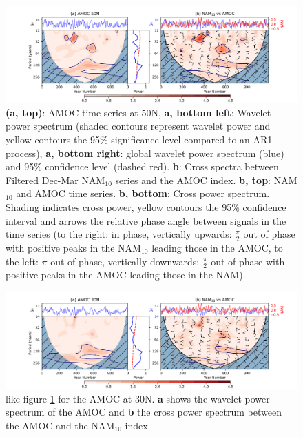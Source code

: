\begin{center}
\begin{figure}[h!]
\noindent\includegraphics[width = \linewidth]{Figures/Figures-surface/AMOC_NAM_filtered_subplot.png}
\caption[Wavelet power spectrum of the AMOC at 50N and cross spectrum with the NAM$_{10}$ index]{\textbf{(a, top)}: AMOC time series at 50N, \textbf{a, bottom left}: Wavelet power spectrum (shaded contours represent wavelet power and yellow contours the 95\% significance level compared to an AR1 process), \textbf{a, bottom right}: global wavelet power spectrum (blue) and 95\% confidence level (dashed red). \textbf{b}: Cross spectra between Filtered Dec-Mar NAM$_{10}$ series and the AMOC index. \textbf{b, top}: NAM$_{10}$ and AMOC time series. \textbf{b, bottom}: Cross power spectrum. Shading indicates cross power, yellow contours the 95\% confidence interval and arrows the relative phase angle between signals in the time series (to the right: in phase, vertically upwards: $\frac{\pi}{2}$ out of phase with positive peaks in the NAM$_{10}$ leading those in the AMOC, to the left: $\pi$ out of phase, vertically downwards: $\frac{\pi}{2}$ out of phase with positive peaks in the AMOC leading those in the NAM).}
\label{NAM_AMOC_Cross}
\end{figure}
\end{center}

\begin{center}
\begin{figure}[h!]
\noindent\includegraphics[width = \linewidth]{Figures/Figures-surface/AMOC_NAM_filtered_subplot_30N.png}
\caption[Wavelet power spectrum of the AMOC at 30N and cross spectrum with the NAM$_{10}$ index]{like figure \ref{NAM_AMOC_Cross} for the AMOC at 30N. \textbf{a} shows the wavelet power spectrum of the AMOC and \textbf{b} the cross power spectrum between the AMOC and the NAM$_{10}$ index.}
\label{NAM_AMOC_Cross_30}
\end{figure}
\end{center}

